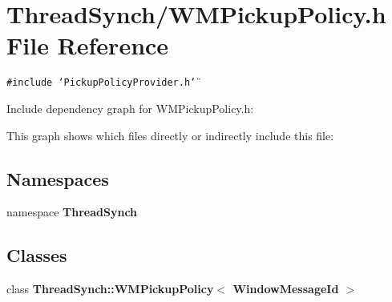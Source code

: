 \section{Thread\-Synch/WMPickup\-Policy.h File Reference}
\label{_w_m_pickup_policy_8h}
{\tt \#include \char`\"{}Pickup\-Policy\-Provider.h\char`\"{}}\par


Include dependency graph for WMPickup\-Policy.h:

This graph shows which files directly or indirectly include this file:\subsection*{Namespaces}
\begin{CompactItemize}
\item 
namespace {\bf Thread\-Synch}
\end{CompactItemize}
\subsection*{Classes}
\begin{CompactItemize}
\item 
class {\bf Thread\-Synch::WMPickup\-Policy$<$ Window\-Message\-Id $>$}
\end{CompactItemize}
